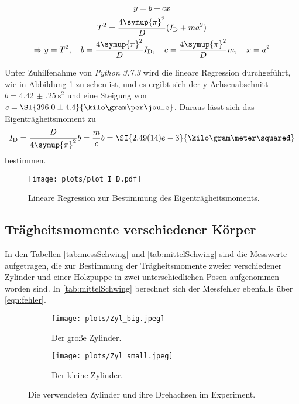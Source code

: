 \begin{gather}
y=b+cx \\
T^2 = \frac{4\symup{\pi}^2}{D}(I_\text{D}+ma^2) \\
\Rightarrow y = T^2, 
\quad b =  \frac{4\symup{\pi}^2}{D} I_\text{D}, 
\quad c = \frac{4\symup{\pi}^2}{D}m ,
\quad x = a^2 
\end{gather}

Unter Zuhilfenahme von \textit{Python 3.7.3} wird die lineare Regression durchgeführt, wie in Abbildung \ref{fig:Thoch2} zu sehen ist, und es ergibt sich der y-Achsenabschnitt~${b=\SI{4.42(25)}{\second\squared}}$
und eine Steigung von ${c=\SI{396.0\pm4.4}{\kilo\gram\per\joule}}$. 
Daraus lässt sich das Eigenträgheitsmoment zu 
\begin{equation}
    I_\text{D}=\frac{D}{4\symup{\pi}^2}b=\frac{m}{c}b=\SI{2.49(14)e-3}{\kilo\gram\meter\squared}
\end{equation}
bestimmen.

\begin{figure}
    \centering
    \texttt{[image: plots/plot\_I\_D.pdf]}
    \caption{Lineare Regression zur Bestimmung des Eigenträgheitsmoments.}
    \label{fig:Thoch2}
\end{figure}

\FloatBarrier
\subsection{Trägheitsmomente verschiedener Körper}

In den Tabellen \ref{tab:messSchwing} und \ref{tab:mittelSchwing} sind die Messwerte aufgetragen, die zur Bestimmung der 
Trägheitsmomente zweier verschiedener Zylinder und einer Holzpuppe in zwei unterschiedlichen Posen aufgenommen worden sind. 
In \ref{tab:mittelSchwing} berechnet sich der Messfehler ebenfalls über \eqref{eqn:fehler}. 

\begin{figure}
    \centering
    \begin{subfigure}{0.48\textwidth}
        \centering
        \texttt{[image: plots/Zyl\_big.jpeg]}
        \caption{Der große Zylinder.}
        \label{fig:grZyl}
    \end{subfigure}
    \begin{subfigure}{0.48\textwidth}
        \centering
        \texttt{[image: plots/Zyl\_small.jpeg]}
        \caption{Der kleine Zylinder.}
        \label{fig:klZyl}
    \end{subfigure}
    \caption{Die verwendeten Zylinder und ihre Drehachsen im Experiment.}
    \label{fig:Zyl}
\end{figure}

